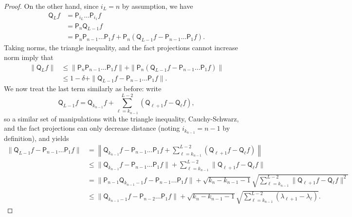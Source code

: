\documentclass[10pt,a4paper]{amsart}
\begin{document}
\begin{proof}
On the other hand, since $i_L=n$ by assumption, we have
\begin{align*}
    \mathsf{Q}_L f &=\mathsf{P}_{i_{L}}\ldots \mathsf{P}_{i_1}f\\
    &= \mathsf{P}_n \mathsf{Q}_{{L-1}}f\\
    &=\mathsf{P}_n\mathsf{P}_{n-1}\ldots \mathsf{P}_1f + \mathsf{P}_n(\mathsf{Q}_{{L-1}}f-\mathsf{P}_{n-1}\ldots \mathsf{P}_1f).
\end{align*}
Taking norms, the triangle inequality, and the fact projections cannot increase norm imply that
\begin{align}
    \|\mathsf{Q}_{{L}}f\|&\leq \|\mathsf{P}_n\mathsf{P}_{n-1}\ldots \mathsf{P}_1f\| + \|\mathsf{P}_n(\mathsf{Q}_{{L-1}}f-\mathsf{P}_{n-1}\ldots \mathsf{P}_1f)\| \nonumber\\
    &\leq 1-\delta + \|\mathsf{Q}_{{L-1}}f-\mathsf{P}_{n-1}\ldots \mathsf{P}_1f\| \label{eq:initial}.
\end{align}
We now treat the last term similarly as before: write
\begin{equation*}
    \mathsf{Q}_{{L-1}}f = \mathsf{Q}_{{k_{n-1}}}f+\sum_{\ell=k_{n-1}}^{L-2} (\mathsf{Q}_{{\ell+1}}f-\mathsf{Q}_{{\ell}}f) ,
\end{equation*}
so a similar set of manipulations with the triangle inequality, Cauchy-Schwarz, and the fact projections can only decrease distance (noting $i_{k_{n-1}}=n-1$ by definition), and  yields
\begin{align*}
    \|\mathsf{Q}_{{L-1}}f-\mathsf{P}_{n-1}\ldots \mathsf{P}_1f\|&=\left\| \mathsf{Q}_{{k_{n-1}}}f-\mathsf{P}_{n-1}\ldots \mathsf{P}_1f+\sum_{\ell=k_{n-1}}^{L-2} (\mathsf{Q}_{{\ell+1}}f-\mathsf{Q}_{{\ell}}f)\right\|\\
    &\leq \| \mathsf{Q}_{{k_{n-1}}}f-\mathsf{P}_{n-1}\ldots \mathsf{P}_1f\|+\sum_{\ell=k_{n-1}}^{L-2} \|\mathsf{Q}_{{\ell+1}}f-\mathsf{Q}_{{\ell}}f\|\\
    &=\| \mathsf{P}_{n-1}\mathsf{Q}_{{k_{n-1}-1}}f-\mathsf{P}_{n-1}\ldots \mathsf{P}_1f\|+\sqrt{k_{n}-k_{n-1}-1} \sqrt{\sum_{\ell=k_{n-1}}^{L-2} \|\mathsf{Q}_{{\ell+1}}f-\mathsf{Q}_{{\ell}}f\|^2}\\
    &\leq \|\mathsf{Q}_{{k_{n-1}-1}}f-\mathsf{P}_{n-2}\ldots \mathsf{P}_1f\|+\sqrt{k_n-k_{n-1}-1}\sqrt{\sum_{\ell=k_{n-1}}^{L-2} (\lambda_{\ell+1}-\lambda_{\ell})}.
\end{align*}


\end{proof}
\end{document}
